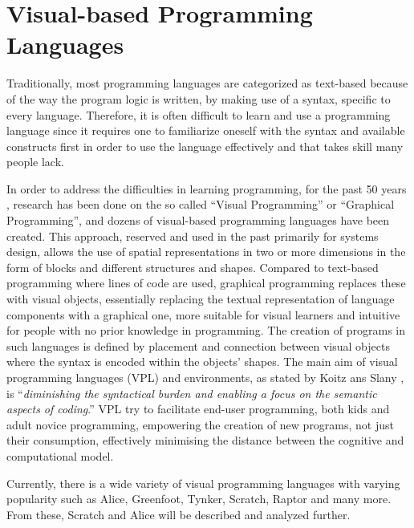 \section{Visual-based Programming Languages}
\label{sec:visual_based_programming_languages}

Traditionally, most programming languages are categorized as text-based because of the way the program logic is written, by making use of a syntax, specific to every language. Therefore, it is often difficult to learn and use a programming language since it requires one to familiarize oneself with the syntax and available constructs first in order to use the language effectively and that takes skill many people lack. 

In order to address the difficulties in learning programming, for the past 50 years \cite{VisualProgHistory}, research has been done on the so called “Visual Programming” or “Graphical Programming”, and dozens of visual-based programming languages have been created. This approach, reserved and used in the past primarily for systems design, allows the use of spatial representations in two or more dimensions in the form of blocks and different structures and shapes. Compared to text-based programming where lines of code are used, graphical programming replaces these with visual objects, essentially replacing the textual representation of language components with a graphical one, more suitable for visual learners and intuitive for people with no prior knowledge in programming. The creation of programs in such languages is defined by placement and connection between visual objects where the syntax is encoded within the objects' shapes.  
The main aim of visual programming languages (VPL) and environments, as stated by Koitz ans Slany \cite{KoitzSlany14}, is “\textit{diminishing the syntactical burden and enabling a focus on the semantic aspects of coding}.” VPL try to facilitate end-user programming, both kids and adult novice programming, empowering the creation of new programs, not just their consumption, effectively minimising the distance between the cognitive and computational model.

Currently, there is a wide variety of visual programming languages with varying popularity such as Alice, Greenfoot, Tynker, Scratch, Raptor and many more. From these, Scratch and Alice will be described and analyzed further.

